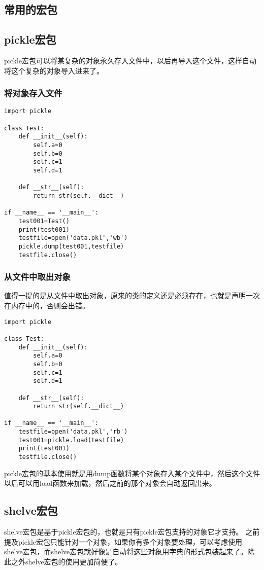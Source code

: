 \documentclass[12pt,oneside]{book}
\begin{document}
\begin{common-format}
\part{常用的宏包}
\chapter{pickle宏包}
\label{sec:pickle宏包}
pickle宏包可以将某复杂的对象永久存入文件中，以后再导入这个文件，这样自动将这个复杂的对象导入进来了。

\section{将对象存入文件}
\begin{Verbatim}
import pickle

class Test:
    def __init__(self):
        self.a=0
        self.b=0
        self.c=1
        self.d=1

    def __str__(self):
        return str(self.__dict__)

if __name__ == '__main__':
    test001=Test()
    print(test001)
    testfile=open('data.pkl','wb')
    pickle.dump(test001,testfile)
    testfile.close()
\end{Verbatim}




\section{从文件中取出对象}
值得一提的是从文件中取出对象，原来的类的定义还是必须存在，也就是声明一次在内存中的，否则会出错。
\begin{Verbatim}
import pickle

class Test:
    def __init__(self):
        self.a=0
        self.b=0
        self.c=1
        self.d=1

    def __str__(self):
        return str(self.__dict__)

if __name__ == '__main__':
    testfile=open('data.pkl','rb')
    test001=pickle.load(testfile)
    print(test001)
    testfile.close()
\end{Verbatim}

pickle宏包的基本使用就是用dump函数将某个对象存入某个文件中，然后这个文件以后可以用load函数来加载，然后之前的那个对象会自动返回出来。


\chapter{shelve宏包}
shelve宏包是基于pickle宏包的，也就是只有pickle宏包支持的对象它才支持。 之前提及pickle宏包只能针对一个对象，如果你有多个对象要处理，可以考虑使用shelve宏包，而shelve宏包就好像是自动将这些对象用字典的形式包装起来了。除此之外shelve宏包的使用更加简便了。


\end{common-format}
\end{document}
